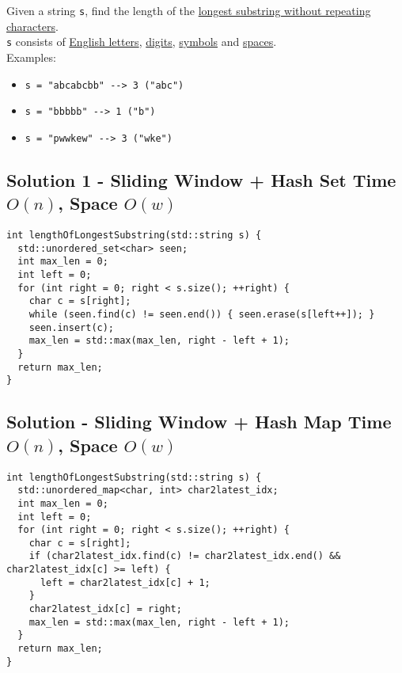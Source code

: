 {Given a string {\colorbox{CodeBackground}{\lstinline|s|}}, find the length of the \ul{longest substring without repeating characters}. \\

{\colorbox{CodeBackground}{\lstinline|s|}} consists of \ul{English letters}, \ul{digits}, \ul{symbols} and \ul{spaces}.\\

Examples:
\begin{itemize}
\item {\colorbox{CodeBackground}{\lstinline|s = "abcabcbb" --> 3 ("abc")|}}
\item {\colorbox{CodeBackground}{\lstinline|s = "bbbbb" --> 1 ("b")|}}
\item {\colorbox{CodeBackground}{\lstinline|s = "pwwkew" --> 3 ("wke")|}}
\end{itemize}

\subsection*{Solution 1 - Sliding Window + Hash Set {\scriptsize\color{gray}\Coffeecup\hspace{1mm}Time $O(n)$, Space $O(w)$}}
\begin{lstlisting}
int lengthOfLongestSubstring(std::string s) {
  std::unordered_set<char> seen;
  int max_len = 0;
  int left = 0;
  for (int right = 0; right < s.size(); ++right) {
    char c = s[right];
    while (seen.find(c) != seen.end()) { seen.erase(s[left++]); }
    seen.insert(c);
    max_len = std::max(max_len, right - left + 1);
  }
  return max_len;
}
\end{lstlisting}

\subsection*{Solution - Sliding Window + Hash Map {\scriptsize\color{gray}\Coffeecup\hspace{1mm}Time $O(n)$, Space $O(w)$}}
\begin{lstlisting}
int lengthOfLongestSubstring(std::string s) {
  std::unordered_map<char, int> char2latest_idx;
  int max_len = 0;
  int left = 0;
  for (int right = 0; right < s.size(); ++right) {
    char c = s[right];
    if (char2latest_idx.find(c) != char2latest_idx.end() && char2latest_idx[c] >= left) {
      left = char2latest_idx[c] + 1;
    }
    char2latest_idx[c] = right;
    max_len = std::max(max_len, right - left + 1);
  }
  return max_len;
}
\end{lstlisting}

}
